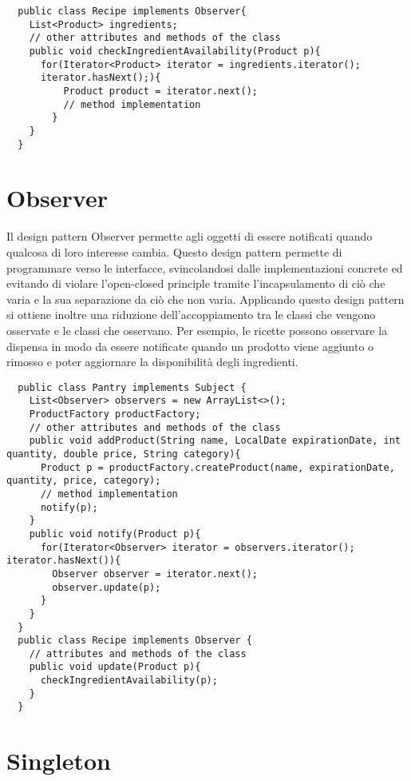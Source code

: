 \begin{lstlisting}
  public class Recipe implements Observer{
    List<Product> ingredients;
    // other attributes and methods of the class
    public void checkIngredientAvailability(Product p){
      for(Iterator<Product> iterator = ingredients.iterator();
      iterator.hasNext();){  
          Product product = iterator.next();
          // method implementation  
        }
    }
  }
\end{lstlisting}

\section{Observer}

Il design pattern Observer permette agli oggetti di essere notificati quando qualcosa di loro interesse cambia. Questo design pattern permette di programmare verso le interfacce, svincolandosi dalle implementazioni concrete ed evitando di violare l'open-closed principle tramite l'incapsulamento di ciò che varia e la sua separazione da ciò che non varia. Applicando questo design pattern si ottiene inoltre una riduzione dell'accoppiamento tra le classi che vengono osservate e le classi che osservano. Per esempio, le ricette possono osservare la dispensa in modo da essere notificate quando un prodotto viene aggiunto o rimosso e poter aggiornare la disponibilità degli ingredienti. 

\begin{lstlisting}
  public class Pantry implements Subject {
    List<Observer> observers = new ArrayList<>();
    ProductFactory productFactory;
    // other attributes and methods of the class
    public void addProduct(String name, LocalDate expirationDate, int quantity, double price, String category){
      Product p = productFactory.createProduct(name, expirationDate, quantity, price, category);
      // method implementation
      notify(p);
    }
    public void notify(Product p){
      for(Iterator<Observer> iterator = observers.iterator(); iterator.hasNext()){
        Observer observer = iterator.next();
        observer.update(p);
      }
    }
  }
  public class Recipe implements Observer {
    // attributes and methods of the class
    public void update(Product p){
      checkIngredientAvailability(p);
    }
  }
\end{lstlisting}

\section{Singleton}

